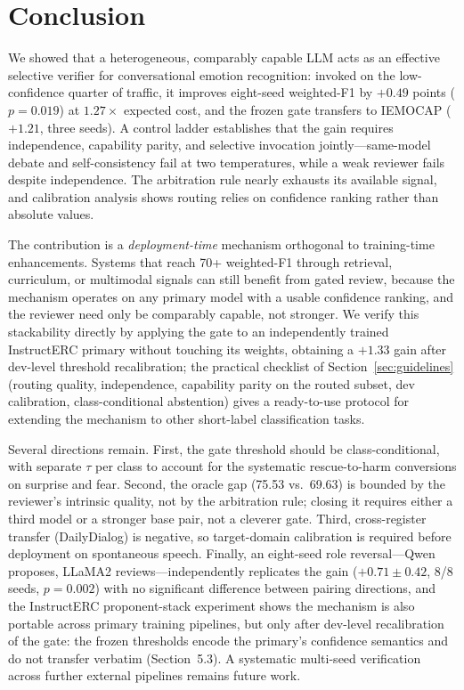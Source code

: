 \documentclass[final,5p,times,twocolumn]{elsarticle}
\begin{document}
\section{Conclusion}
\label{sec:conclusion}
We showed that a heterogeneous, comparably capable LLM acts as an effective
selective verifier for conversational emotion recognition: invoked on the
low-confidence quarter of traffic, it improves eight-seed weighted-F1 by
$+0.49$ points ($p{=}0.019$) at $1.27\times$ expected cost, and the frozen
gate transfers to IEMOCAP ($+1.21$, three seeds). A control ladder
establishes that the gain requires independence, capability parity, and
selective invocation jointly---same-model debate and self-consistency fail at
two temperatures, while a weak reviewer fails despite independence. The
arbitration rule nearly exhausts its available signal, and calibration
analysis shows routing relies on confidence ranking rather than absolute
values.

The contribution is a \emph{deployment-time} mechanism orthogonal to
training-time enhancements. Systems that reach 70+ weighted-F1 through
retrieval, curriculum, or multimodal signals can still benefit from gated
review, because the mechanism operates on any primary model with a usable
confidence ranking, and the reviewer need only be comparably capable, not
stronger. We verify this stackability directly by applying the gate to an
independently trained InstructERC primary without touching its weights,
obtaining a $+1.33$ gain after dev-level threshold recalibration; the
practical checklist of Section~\ref{sec:guidelines}
(routing quality, independence, capability parity on the routed subset,
dev calibration, class-conditional abstention) gives a ready-to-use
protocol for extending the mechanism to other short-label classification
tasks.

Several directions remain. First, the gate threshold should be
class-conditional, with separate $\tau$ per class to account for the
systematic rescue-to-harm conversions on surprise and fear.
Second, the oracle gap (75.53 vs.\ 69.63) is bounded by the reviewer's
intrinsic quality, not by the arbitration rule; closing it requires either
a third model or a stronger base pair, not a cleverer gate.
Third, cross-register transfer (DailyDialog) is negative, so
target-domain calibration is required before deployment on spontaneous
speech. Finally, an eight-seed role reversal---Qwen proposes, LLaMA2
reviews---independently replicates the gain ($+0.71 \pm 0.42$, 8/8 seeds,
$p{=}0.002$) with no significant difference between pairing directions, and
the InstructERC proponent-stack experiment shows the mechanism is also
portable across primary training pipelines, but only after dev-level
recalibration of the gate: the frozen thresholds encode the primary's
confidence semantics and do not transfer verbatim (Section~5.3). A
systematic multi-seed verification across further external pipelines
remains future work.
\end{document}
